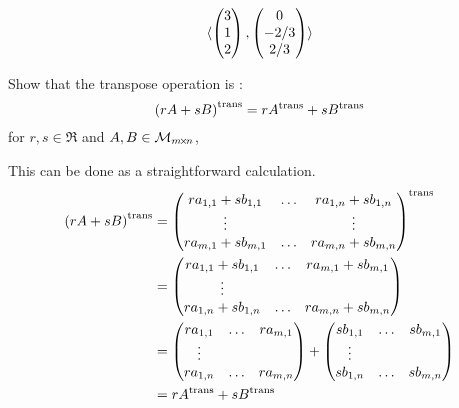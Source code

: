 \begin{exercises}
\begin{answer}
\begin{equation*}
        \langle \begin{pmatrix} 3 \\ 1 \\ 2 \end{pmatrix},
                   \begin{pmatrix} 0 \\ -2/3 \\ 2/3 \end{pmatrix}  \rangle
      \end{equation*}  
    \end{answer}
  \item 
    Show that the transpose operation is 
    :
    \begin{equation*}
      {{(rA+sB)}^{\rm trans}}  = r{{A}^{\rm trans}}+s{{B}^{\rm trans}}
    \end{equation*}
    for \( r,s\in\Re \) and \( A,B\in\mathcal{M}_{m \! \times \! n} \),
    \begin{answer}
      This can be done as a straightforward calculation.
      \begin{align*}
        \trans{(rA+sB)}
        &=\trans{\begin{pmatrix}
             ra_{1,1}+sb_{1,1}  &\ldots &ra_{1,n}+sb_{1,n} \\
             \vdots             &       &\vdots            \\
             ra_{m,1}+sb_{m,1}  &\ldots &ra_{m,n}+sb_{m,n}
                \end{pmatrix}  }  \\
        &=\begin{pmatrix}
           ra_{1,1}+sb_{1,1}  &\ldots &ra_{m,1}+sb_{m,1}  \\
           \vdots                                         \\
           ra_{1,n}+sb_{1,n}  &\ldots &ra_{m,n}+sb_{m,n}
         \end{pmatrix}           \\
        &=\begin{pmatrix}
           ra_{1,1}  &\ldots &ra_{m,1}  \\
           \vdots                       \\
           ra_{1,n}  &\ldots &ra_{m,n}
         \end{pmatrix}           
        +\begin{pmatrix}
           sb_{1,1}  &\ldots &sb_{m,1}  \\
           \vdots                       \\
           sb_{1,n}  &\ldots &sb_{m,n}
         \end{pmatrix}           \\
        &=r\trans{A}+s\trans{B}

\end{align*}
\end{answer}
\end{exercises}
